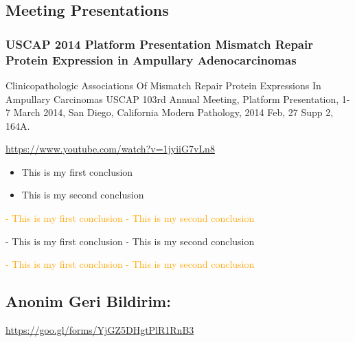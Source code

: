 \documentclass[]{article}
\providecommand{\tightlist}{%
  \setlength{\itemsep}{0pt}\setlength{\parskip}{0pt}}
\begin{document}
\hypertarget{meeting-presentations}{%
\subsection{Meeting Presentations}\label{meeting-presentations}}

\hypertarget{uscap-2014-platform-presentation-mismatch-repair-protein-expression-in-ampullary-adenocarcinomas}{%
\subsubsection{USCAP 2014 Platform Presentation Mismatch Repair Protein
Expression in Ampullary
Adenocarcinomas}\label{uscap-2014-platform-presentation-mismatch-repair-protein-expression-in-ampullary-adenocarcinomas}}

Clinicopathologic Associations Of Mismatch Repair Protein Expressions In
Ampullary Carcinomas USCAP 103rd Annual Meeting, Platform Presentation,
1-7 March 2014, San Diego, California Modern Pathology, 2014 Feb, 27
Supp 2, 164A.

\url{https://www.youtube.com/watch?v=1jyiiG7vLn8}

\begin{itemize}
\tightlist
\item
  This is my first conclusion
\item
  This is my second conclusion
\end{itemize}

\textcolor{orange}{
- This is my first conclusion
- This is my second conclusion
}

\colorbox{fancyTextColor}{

- This is my first conclusion
- This is my second conclusion

}

\colorbox{fancyTextColor}{
\textcolor{orange}{
- This is my first conclusion
- This is my second conclusion
}
}

\hypertarget{anonim-geri-bildirim}{%
\subsection{Anonim Geri Bildirim:}\label{anonim-geri-bildirim}}

\url{https://goo.gl/forms/YjGZ5DHgtPlR1RnB3}
\end{document}
